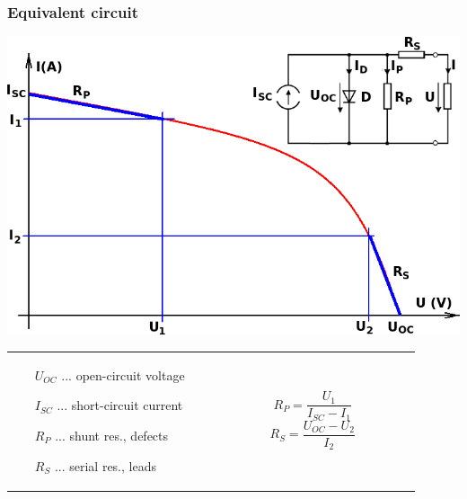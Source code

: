 \documentclass{beamer}
\begin{document}
	\begin{frame}
    \frametitle{Equivalent circuit}
		\begin{center}
			\includegraphics[scale=0.3]{obr07_odpory.png}
		\end{center}
		\small
		\begin{tabular}{m{0.45\linewidth} m{0.45\linewidth}}		
		\begin{itemize}
			\item[$U_{OC}$]... open-circuit voltage
			\item[$I_{SC}$]... short-circuit current
			\item[$R_{P}$]... shunt res., defects
			\item[$R_{S}$]... serial res., leads
		\end{itemize}
		& $$R_P=\frac{U_1}{I_{SC}-I_1}$$ $$R_S=\frac{U_{OC}-U_2}{I_2}$$
		\end{tabular}
	\end{frame}
\end{document}
